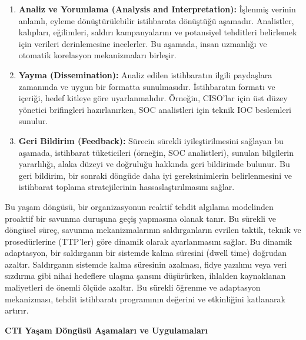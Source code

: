 \begin{enumerate}
    \item \textbf{Analiz ve Yorumlama (Analysis and Interpretation):} İşlenmiş verinin anlamlı, eyleme dönüştürülebilir istihbarata dönüştüğü aşamadır. Analistler, kalıpları, eğilimleri, saldırı kampanyalarını ve potansiyel tehditleri belirlemek için verileri derinlemesine incelerler. Bu aşamada, insan uzmanlığı ve otomatik korelasyon mekanizmaları birleşir.
    \item \textbf{Yayma (Dissemination):} Analiz edilen istihbaratın ilgili paydaşlara zamanında ve uygun bir formatta sunulmasıdır. İstihbaratın formatı ve içeriği, hedef kitleye göre uyarlanmalıdır. Örneğin, CISO'lar için üst düzey yönetici brifingleri hazırlanırken, SOC analistleri için teknik IOC beslemleri sunulur.
    \item \textbf{Geri Bildirim (Feedback):} Sürecin sürekli iyileştirilmesini sağlayan bu aşamada, istihbarat tüketicileri (örneğin, SOC analistleri), sunulan bilgilerin yararlılığı, alaka düzeyi ve doğruluğu hakkında geri bildirimde bulunur. Bu geri bildirim, bir sonraki döngüde daha iyi gereksinimlerin belirlenmesini ve istihbarat toplama stratejilerinin hassaslaştırılmasını sağlar.
\end{enumerate}

Bu yaşam döngüsü, bir organizasyonun reaktif tehdit algılama modelinden proaktif bir savunma duruşuna geçiş yapmasına olanak tanır. Bu sürekli ve döngüsel süreç, savunma mekanizmalarının saldırganların evrilen taktik, teknik ve prosedürlerine (TTP'ler) göre dinamik olarak ayarlanmasını sağlar. Bu dinamik adaptasyon, bir saldırganın bir sistemde kalma süresini (dwell time) doğrudan azaltır. Saldırganın sistemde kalma süresinin azalması, fidye yazılımı veya veri sızdırma gibi nihai hedeflere ulaşma şansını düşürürken, ihlalden kaynaklanan maliyetleri de önemli ölçüde azaltır. Bu sürekli öğrenme ve adaptasyon mekanizması, tehdit istihbaratı programının değerini ve etkinliğini katlanarak artırır.

\textbf{CTI Yaşam Döngüsü Aşamaları ve Uygulamaları}

